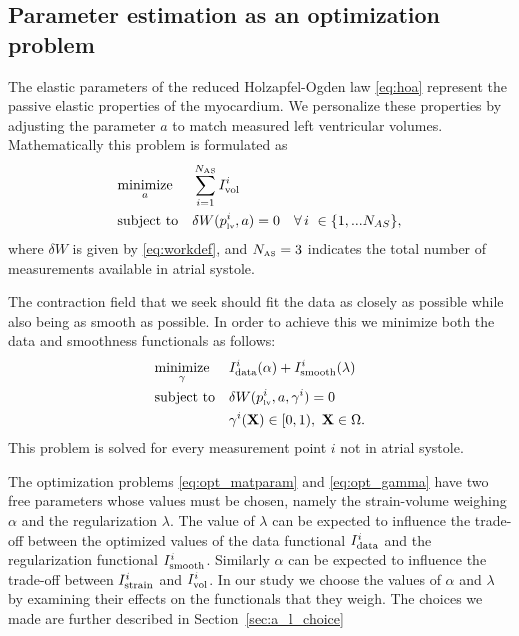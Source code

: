 \subsection{Parameter estimation as an optimization problem}
\label{sec:param_est}
The elastic parameters of the reduced
Holzapfel-Ogden law \eqref{eq:hoa} represent the passive elastic
properties of the myocardium. We personalize these properties by
adjusting the parameter $a$ to match measured left ventricular volumes.
Mathematically this problem is formulated as
\begin{equation}
\begin{aligned}
\label{eq:opt_matparam}
& \underset{a}{\text{minimize}}
& &  \sum_{i = 1}^{N_\textnormal{\tiny \text{AS}}} I_{\text{vol}}^i \\
& \text{subject to}
& & \delta W(p_{\textnormal{\tiny{lv}}}^i, a) = 0 \quad \forall \,  i \ \in \{1,...N_{AS} \},
\end{aligned}
\end{equation}
where $\delta W$ is given by \eqref{eq:workdef}, and $N_\textnormal{\tiny \text{AS}} =
3$ indicates the total number of measurements available in atrial
systole.

The contraction field that we seek should fit the data as closely as possible while 
also being as smooth as possible. In order to achieve this we minimize both the 
data and smoothness functionals as follows:
\begin{equation}
\begin{aligned}
\label{eq:opt_gamma}
& \underset{\gamma}{\text{minimize}}
& & I_{\text{data}}^i(\alpha) + I_{\text{smooth}}^i(\lambda) \\
& \text{subject to}
& &  \delta W(p_{\textnormal{\tiny{lv}}}^i, a, \gamma^i) = 0 \quad \\
&&& \gamma^i(\mathbf{X}) \in [0, 1), \ \mathbf{X} \in \Omega.
\end{aligned}
\end{equation}
This problem is solved for every measurement point $i$ not in atrial systole.

The optimization problems \eqref{eq:opt_matparam} and \eqref{eq:opt_gamma} have two
free parameters whose values must be chosen, namely the strain-volume
weighing $\alpha$ and the regularization $\lambda$. The value of $\lambda$ can be expected to influence the trade-off
between the optimized values of the data functional $I_{\text{data}}^i$ and the regularization functional
$I_{\text{smooth}}^i$. Similarly $\alpha$ can be expected to influence the trade-off between $I_{\text{strain}}^i$
and $I_{\text{vol}}^i$. In our study we choose the values of $\alpha$ and $\lambda$ by examining their effects on the functionals
that they weigh. The choices we made are further described in Section~\ref{sec:a_l_choice}

